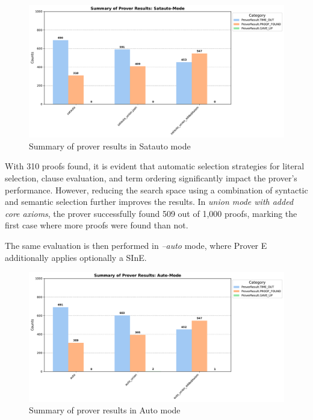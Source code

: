 \documentclass[english,version-2020-11]{uzl-thesis}
\begin{document}
\begin{figure}[h!]
    \centering
    \includegraphics[width=\textwidth]{satauto_mode_output.pdf}
    \caption{Summary of prover results in Satauto mode}
    \label{fig:prover_results_satauto}
\end{figure}
\FloatBarrier

With 310 proofs found, it is evident that automatic selection strategies for literal selection, clause evaluation, and term ordering significantly impact the prover's performance. However, reducing the search space using a combination of syntactic and semantic selection further improves the results. In \textit{union mode with added core axioms}, the prover successfully found 509 out of 1,000 proofs, marking the first case where more proofs were found than not.

The same evaluation is then performed in \textit{--auto} mode, where Prover E additionally applies optionally a SInE.

\begin{figure}[h!]
    \centering
    \includegraphics[width=\textwidth]{auto_mode_output.pdf}
    \caption{Summary of prover results in Auto mode}
    \label{fig:prover_results_auto}
\end{figure}
\FloatBarrier
\end{document}
